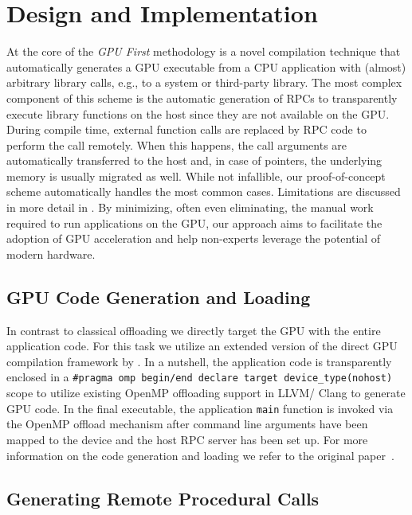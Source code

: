 \section{Design and Implementation}
\label{sec:implementation}

At the core of the \emph{GPU First} methodology is a novel compilation technique that automatically generates a GPU executable from a CPU application with (almost) arbitrary library calls, e.g., to a system or third-party library.
The most complex component of this scheme is the automatic generation of RPCs to transparently execute library functions on the host since they are not available on the GPU.
During compile time, external function calls are replaced by RPC code to perform the call remotely.
When this happens, the call arguments are automatically transferred to the host and, in case of pointers, the underlying memory is usually migrated as well.
While not infallible, our proof-of-concept scheme automatically handles the most common cases.
Limitations are discussed in more detail in .
By minimizing, often even eliminating, the manual work required to run applications on the GPU, our approach aims to facilitate the adoption of GPU acceleration and help non-experts leverage the potential of modern hardware.

\subsection{GPU Code Generation and Loading}

In contrast to classical offloading we directly target the GPU with the entire application code.
For this task we utilize an extended version of the direct GPU compilation framework by \citet{DBLP:conf/llvmhpc/TianHPCD22}.
In a nutshell, the application code is transparently enclosed in a \lstinline{#pragma omp begin/end declare target device_type(nohost)}\\ scope to utilize existing OpenMP offloading support in LLVM/ Clang to generate GPU code.
In the final executable, the application \lstinline{main} function is invoked via the OpenMP offload mechanism after command line arguments have been mapped to the device and the host RPC server has been set up.
For more information on the code generation and loading we refer to the original paper~\cite{DBLP:conf/llvmhpc/TianHPCD22}.

\subsection{Generating Remote Procedural Calls}
\label{sec:rpc-and-memory}

